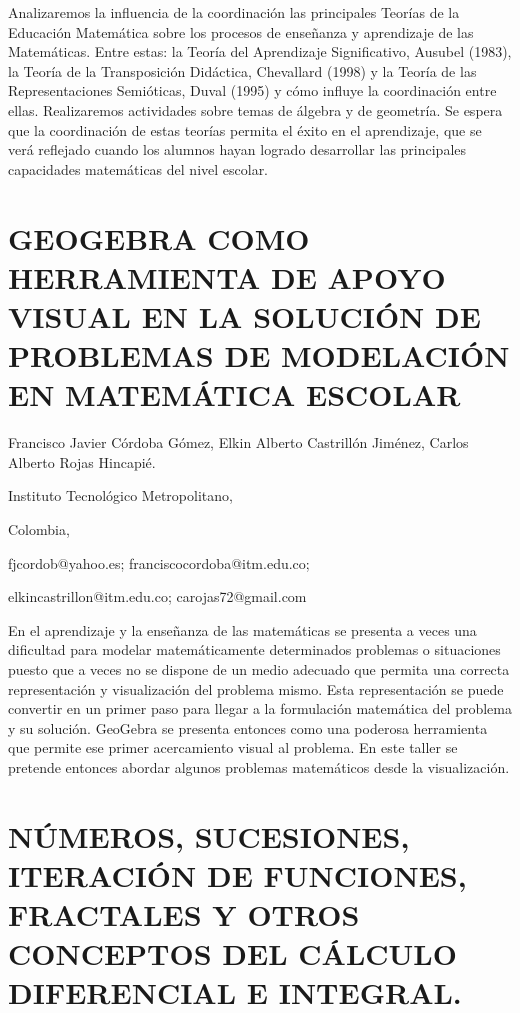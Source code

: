 Analizaremos la influencia de la coordinación las principales Teorías
de la Educación Matemática sobre los procesos de enseñanza y aprendizaje
de las Matemáticas. Entre estas: la Teoría del Aprendizaje Significativo,
Ausubel (1983), la Teoría de la Transposición Didáctica, Chevallard
(1998) y la Teoría de las Representaciones Semióticas, Duval (1995)
y cómo influye la coordinación entre ellas. Realizaremos actividades
sobre temas de álgebra y de geometría. Se espera que la coordinación
de estas teorías permita el éxito en el aprendizaje, que se verá reflejado
cuando los alumnos hayan logrado desarrollar las principales capacidades
matemáticas del nivel escolar. 


\section{GEOGEBRA COMO HERRAMIENTA DE APOYO VISUAL EN LA SOLUCIÓN DE PROBLEMAS
DE MODELACIÓN EN MATEMÁTICA ESCOLAR}

\begin{datos}

Francisco Javier Córdoba Gómez, Elkin Alberto Castrillón Jiménez,
Carlos Alberto Rojas Hincapié.

Instituto Tecnológico Metropolitano,

Colombia,

fjcordob@yahoo.es; franciscocordoba@itm.edu.co; 

elkincastrillon@itm.edu.co; carojas72@gmail.com

\end{datos}

En el aprendizaje y la enseñanza de las matemáticas se presenta a
veces una dificultad para modelar matemáticamente determinados problemas
o situaciones puesto que a veces no se dispone de un medio adecuado
que permita una correcta representación y visualización del problema
mismo. Esta representación se puede convertir en un primer paso para
llegar a la formulación matemática del problema y su solución. GeoGebra
se presenta entonces como una poderosa herramienta que permite ese
primer acercamiento visual al problema. En este taller se pretende
entonces abordar algunos problemas matemáticos desde la visualización.


\section{NÚMEROS, SUCESIONES, ITERACIÓN DE FUNCIONES, FRACTALES Y OTROS CONCEPTOS
DEL CÁLCULO DIFERENCIAL E INTEGRAL.}

